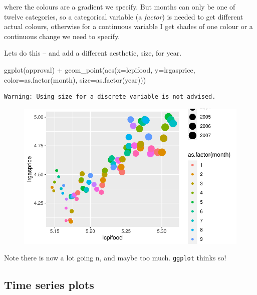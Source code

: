 \documentclass[
  letterpaper,
]{book}
\newenvironment{Shaded}{\begin{snugshade}}{\end{snugshade}}
\newcommand{\AttributeTok}[1]{\textcolor[rgb]{0.40,0.45,0.13}{#1}}
\newcommand{\FunctionTok}[1]{\textcolor[rgb]{0.28,0.35,0.67}{#1}}
\newcommand{\NormalTok}[1]{\textcolor[rgb]{0.00,0.23,0.31}{#1}}
\newcommand{\SpecialCharTok}[1]{\textcolor[rgb]{0.37,0.37,0.37}{#1}}
\begin{document}
where the colours are a gradient we specify. But months can only be one
of twelve categories, so a categorical variable (a \emph{factor}) is
needed to get different actual colours, otherwise for a continuous
variable I get shades of one colour or a continuous change we need to
specify.

Lets do this -- and add a different aesthetic, size, for year.

\begin{Shaded}
\begin{Highlighting}[]
\FunctionTok{ggplot}\NormalTok{(approval) }\SpecialCharTok{+}
  \FunctionTok{geom\_point}\NormalTok{(}\FunctionTok{aes}\NormalTok{(}\AttributeTok{x=}\NormalTok{lcpifood, }\AttributeTok{y=}\NormalTok{lrgasprice, }\AttributeTok{color=}\FunctionTok{as.factor}\NormalTok{(month), }\AttributeTok{size=}\FunctionTok{as.factor}\NormalTok{(year)))}
\end{Highlighting}
\end{Shaded}

\begin{verbatim}
Warning: Using size for a discrete variable is not advised.
\end{verbatim}

\begin{figure}[H]

{\centering \includegraphics{Appendix1_files/figure-pdf/p3-1.pdf}

}

\end{figure}

Note there is now a lot going n, and maybe too much. \texttt{ggplot}
thinks so!

\hypertarget{time-series-plots}{%
\subsection{Time series plots}\label{time-series-plots}}
\end{document}
